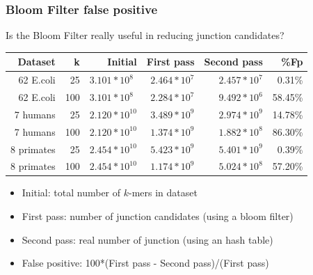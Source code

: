 
\begin{frame}
	\frametitle{Bloom Filter false positive}
	\centering
	
	  Is the Bloom Filter really useful in reducing junction candidates?
	  
    \bigskip
	  
    \begin{tabular}{ r | r | r | r | r | r }
    \hline
    Dataset    &   k &            Initial &       First pass &      Second pass & \%Fp \\ \hline
    62 E.coli  &  25 &  $3.101 * 10^{8\phantom{0}}$  & $2.464 * 10^{7}$ & $2.457 * 10^{7}$ & \phantom{0}0.31\% \\
    62 E.coli  & 100 &  $3.101 * 10^{8\phantom{0}}$  & $2.284 * 10^{7}$ & $9.492 * 10^{6}$ & 58.45\% \\
    7 humans   &  25 &  $2.120 * 10^{10}$ & $3.489 * 10^{9}$ & $2.974 * 10^{9}$ & 14.78\% \\
    7 humans   & 100 &  $2.120 * 10^{10}$ & $1.374 * 10^{9}$ & $1.882 * 10^{8}$ & 86.30\% \\
    8 primates &  25 &  $2.454 * 10^{10}$ & $5.423 * 10^{9}$ & $5.401 * 10^{9}$ & \phantom{0}0.39\% \\
    8 primates & 100 &  $2.454 * 10^{10}$ & $1.174 * 10^{9}$ & $5.024 * 10^{8}$ & 57.20\% \\ \hline
    \end{tabular}
    
    
    \bigskip
    
    \begin{itemize}
      \item Initial: total number of $k$-mers in dataset
      \item First pass: number of junction candidates (using a bloom filter)
      \item Second pass: real number of junction (using an hash table)
      \item False positive: 100*(First pass - Second pass)/(First pass)
    \end{itemize}
    
\end{frame}
